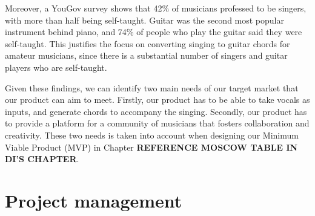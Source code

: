 Moreover, a YouGov survey \cite{YouGovMR} shows that 42\% of musicians professed to be singers, with more than half being self-taught. Guitar was the second most popular instrument behind piano, and 74\% of people who play the guitar said they were self-taught. This justifies the focus on converting singing to guitar chords for amateur musicians, since there is a substantial number of singers and guitar players who are self-taught.  

Given these findings, we can identify two main needs of our target market that our product can aim to meet. Firstly, our product has to be able to take vocals as inputs, and generate chords to accompany the singing. Secondly, our product has to provide a platform for a community of musicians that fosters collaboration and creativity. These two needs is taken into account when designing our Minimum Viable Product (MVP) in Chapter \textbf{REFERENCE MOSCOW TABLE IN DI'S CHAPTER}.



\section{Project management}

